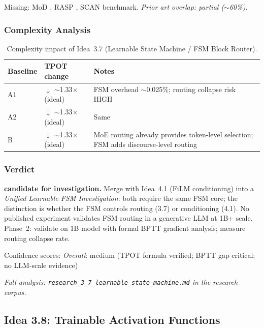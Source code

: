 \documentclass[11pt]{article}
\begin{document}
\noindent
Missing: MoD \cite{RaposoEtAl2024}, RASP \cite{WeissEtAl2021}, SCAN benchmark.
\emph{Prior art overlap: partial ($\sim$60\%).}

\subsubsection*{Complexity Analysis}

\begin{table}[h]
\centering
\caption{Complexity impact of Idea~3.7 (Learnable State Machine / FSM Block Router).}
\label{tab:complexity-3-7}
\begin{tabular}{llp{7cm}}
\toprule
\textbf{Baseline} & \textbf{TPOT change} & \textbf{Notes} \\
\midrule
A1 & $\downarrow$ $\sim$1.33$\times$ (ideal) & FSM overhead $\sim$0.025\%; routing collapse risk HIGH \\
A2 & $\downarrow$ $\sim$1.33$\times$ (ideal) & Same \\
B  & $\downarrow$ $\sim$1.33$\times$ (ideal) & MoE routing already provides token-level selection; FSM adds discourse-level routing \\
\bottomrule
\end{tabular}
\end{table}

\subsubsection*{Verdict}
\textbf{candidate for investigation.}
Merge with Idea~4.1 (FiLM conditioning) into a \emph{Unified Learnable FSM Investigation}: both require the same FSM core; the distinction is whether the FSM controls routing (3.7) or conditioning (4.1).
No published experiment validates FSM routing in a generative LLM at 1B+ scale.
Phase~2: validate on 1B model with formal BPTT gradient analysis; measure routing collapse rate.

\noindent
Confidence scores:
\emph{Overall}: medium (TPOT formula verified; BPTT gap critical; no LLM-scale evidence)

\par\noindent\textit{Full analysis: \texttt{research\_3\_7\_learnable\_state\_machine.md} in the research corpus.}

\subsection{Idea 3.8: Trainable Activation Functions}
\label{subsec:idea-3-8}
\end{document}
